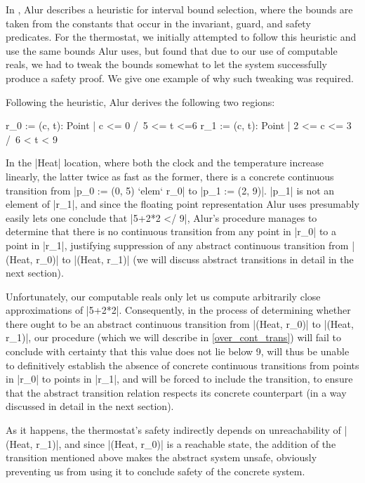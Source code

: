 \documentclass[runningheads]{llncs}
\begin{document}

In \cite{alur}, Alur describes a heuristic for interval bound selection, where the bounds are taken from the constants that occur in the invariant, guard, and safety predicates. For the thermostat, we initially attempted to follow this heuristic and use the same bounds Alur uses, but found that due to our use of computable reals, we had to tweak the bounds somewhat to let the system successfully produce a safety proof. We give one example of why such tweaking was required.

Following the heuristic, Alur derives the following two regions:
\begin{code}
  r_0 := { (c, t): Point | c <= 0 /\ 5 <= t <=6 }
  r_1 := { (c, t): Point | 2 <= c <= 3 /\ 6 < t < 9 }
\end{code}

In the |Heat| location, where both the clock and the temperature increase linearly, the latter twice as fast as the former, there is a concrete continuous transition from |p_0 := (0, 5) `elem` r_0| to |p_1 := (2, 9)|. |p_1| is not an element of |r_1|, and since the floating point representation Alur uses presumably easily lets one conclude that |5+2*2 </ 9|, Alur's procedure manages to determine that there is no continuous transition from any point in |r_0| to a point in |r_1|, justifying suppression of any abstract continuous transition from |(Heat, r_0)| to |(Heat, r_1)| (we will discuss abstract transitions in detail in the next section).

Unfortunately, our computable reals only let us compute arbitrarily close approximations of |5+2*2|. 
Consequently, in the process of determining whether there ought to be an abstract continuous transition from |(Heat, r_0)| to |(Heat, r_1)|, our procedure (which we will describe in \ref{over_cont_trans}) will fail to conclude with certainty that this value does not lie below 9, will thus be unable to definitively establish the absence of concrete continuous transitions from points in |r_0| to points in |r_1|, and will be forced to include the transition, to ensure that the abstract transition relation respects its concrete counterpart (in a way discussed in detail in the next section).

As it happens, the thermostat's safety indirectly depends on unreachability of |(Heat, r_1)|, and since |(Heat, r_0)| is a reachable state, the addition of the transition mentioned above makes the abstract system unsafe, obviously preventing us from using it to conclude safety of the concrete system.
\end{document}
